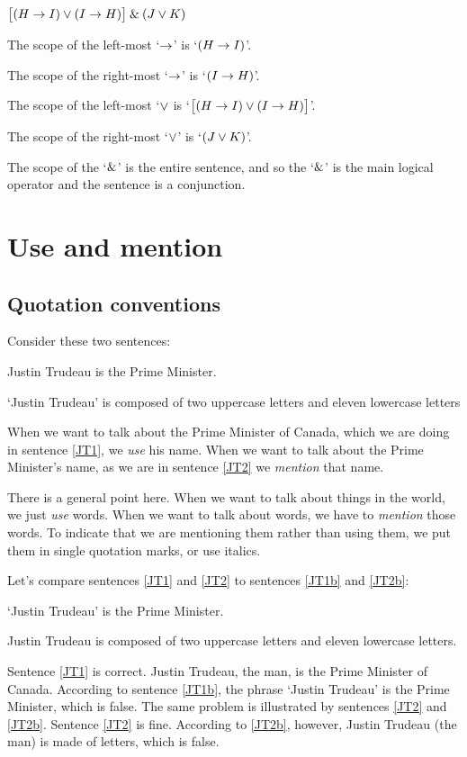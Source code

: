 \problempart $\bigl[(H \rightarrow I) \vee (I \rightarrow H)\bigr] \mathbin{\&} (J \vee K)$\medskip

\noindent The scope of the left-most `$\rightarrow$' is `$(H \rightarrow I)$'. 

\noindent The scope of the right-most `$\rightarrow$' is `$(I \rightarrow H)$'. 

\noindent The scope of the left-most `$\vee$ is `$\bigl[(H \rightarrow I) \vee (I \rightarrow H)\bigr]$'.

\noindent The scope of the right-most `$\vee$' is `$(J \vee K)$'.

\noindent The scope of the `$\mathbin{\&}$' is the entire sentence, and so the `$\mathbin{\&}$' is the main logical operator and the sentence is a conjunction.







\chapter{Use and mention}\label{s:UseMention}

\section{Quotation conventions}
Consider these two sentences:
	\begin{earg}
		\item[\ex{JT1}] Justin Trudeau is the Prime Minister.
		\item[\ex{JT2}] `Justin Trudeau' is composed of two uppercase letters and eleven lowercase letters
	\end{earg}
When we want to talk about the Prime Minister of Canada, which we are doing in sentence \ref{JT1}, we \textit{use} his name. When we want to talk about the Prime Minister's name, as we are in sentence \ref{JT2} we \emph{mention} that name.

There is a general point here. When we want to talk about things in the world, we just \emph{use} words. When we want to talk about words, we have to \emph{mention} those words. To indicate that we are mentioning them rather than using them, we put them in single quotation marks, or use italics. 

Let's compare sentences \ref{JT1} and \ref{JT2} to sentences \ref{JT1b} and \ref{JT2b}:
	\begin{earg}
		\item[\ex{JT1b}] `Justin Trudeau' is the Prime Minister.
		\item[\ex{JT2b}] Justin Trudeau is composed of two uppercase letters and eleven lowercase letters.
	\end{earg}
Sentence \ref{JT1} is correct. Justin Trudeau, the man, is the Prime Minister of Canada. According to sentence \ref{JT1b}, the phrase `Justin Trudeau' is the Prime Minister, which is false. The same problem is illustrated by sentences \ref{JT2} and \ref{JT2b}. Sentence \ref{JT2} is fine. According to \ref{JT2b}, however, Justin Trudeau (the man) is made of letters, which is false. 

